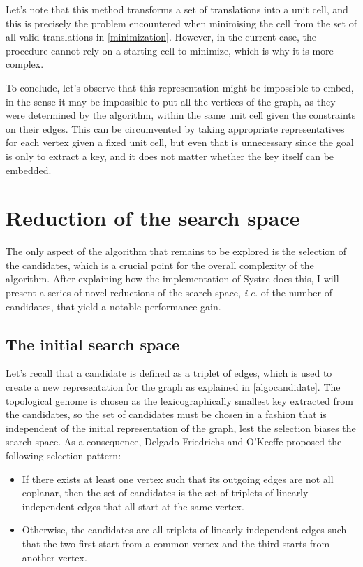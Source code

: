 \documentclass[main.tex]{subfiles}
\begin{document}
Let's note that this method transforms a set of translations into a unit cell, and this is precisely the problem encountered when minimising the cell from the set of all valid translations in \cref{minimization}. However, in the current case, the procedure cannot rely on a starting cell to minimize, which is why it is more complex.

To conclude, let's observe that this representation might be impossible to embed, in the sense it may be impossible to put all the vertices of the graph, as they were determined by the algorithm, within the same unit cell given the constraints on their edges. This can be circumvented by taking appropriate representatives for each vertex given a fixed unit cell, but even that is unnecessary since the goal is only to extract a key, and it does not matter whether the key itself can be embedded.




\section{Reduction of the search space}

\label{searchspacereduction}

The only aspect of the algorithm that remains to be explored is the selection of the candidates, which is a crucial point for the overall complexity of the algorithm. After explaining how the implementation of Systre does this, I will present a series of novel reductions of the search space, \textit{i.e.} of the number of candidates, that yield a notable performance gain.

\subsection{The initial search space}

Let's recall that a candidate is defined as a triplet of edges, which is used to create a new representation for the graph as explained in \cref{algocandidate}. The topological genome is chosen as the lexicographically smallest key extracted from the candidates, so the set of candidates must be chosen in a fashion that is independent of the initial representation of the graph, lest the selection biases the search space. As a consequence, Delgado-Friedrichs and O'Keeffe \autocite{Systre} proposed the following selection pattern:
\begin{itemize}[noitemsep]
	\item If there exists at least one vertex such that its outgoing edges are not all coplanar, then the set of candidates is the set of triplets of linearly independent edges that all start at the same vertex.
	\item Otherwise, the candidates are all triplets of linearly independent edges such that the two first start from a common vertex and the third starts from another vertex.
\end{itemize}
\end{document}
